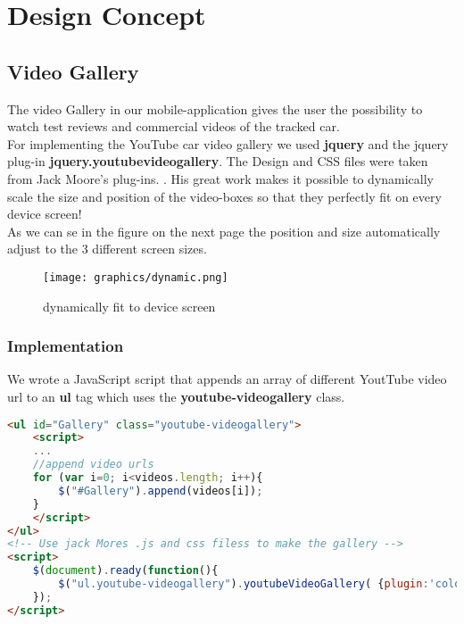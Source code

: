 

\chapter{Design Concept} \label{chapter:desgin}

\section{Video Gallery}
The video Gallery in our mobile-application gives the user the possibility to watch test reviews and commercial videos of the tracked car.
\\

   
For implementing the YouTube car video gallery we used \textbf{jquery} and the jquery plug-in \textbf{jquery.youtubevideogallery}. The Design and CSS files were taken from Jack Moore's plug-ins. \cite{jqueryVideo}. His great work makes it possible to dynamically scale the size and position of the video-boxes so that they perfectly fit on every device screen! 
\\

As we can se in the figure on the next page the position and size automatically adjust to the 3 different screen sizes.    

\begin{figure}[htbp]
\centering
\texttt{[image: graphics/dynamic.png]}
\caption{dynamically fit to device screen}
\end{figure}  

\newpage
\subsection{Implementation}
We wrote a JavaScript script that appends an array of different YoutTube video url to an \textbf{ul} tag which uses the \textbf{youtube-videogallery} class.   

\begin{lstlisting}[language=html, caption= 
extracts from the video gallery src]
<ul id="Gallery" class="youtube-videogallery">
	<script>
	... 
	//append video urls
	for (var i=0; i<videos.length; i++){
		$("#Gallery").append(videos[i]);
	}
	</script>
</ul>
<!-- Use jack Mores .js and css filess to make the gallery -->
<script>
    $(document).ready(function(){
        $("ul.youtube-videogallery").youtubeVideoGallery( {plugin:'colorbox',assetFolder:'../'} );
    });
</script> 
\end{lstlisting}